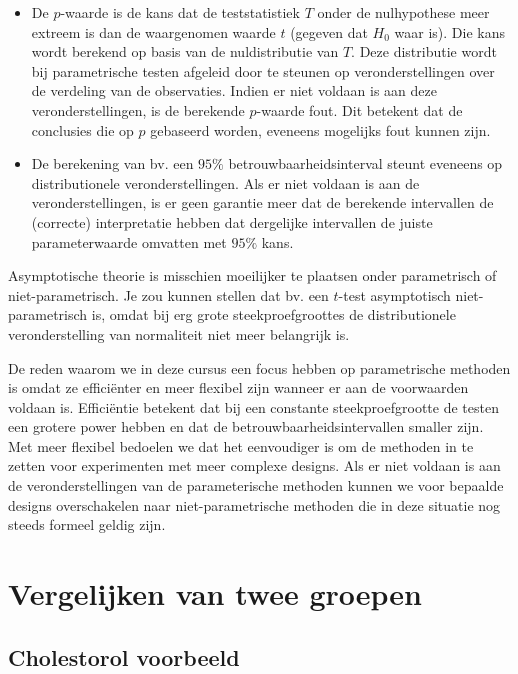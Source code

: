 \documentclass[
  12pt,dutch]{book}
\theoremstyle{definition}
\theoremstyle{definition}
\theoremstyle{definition}
\theoremstyle{definition}
\theoremstyle{remark}
\begin{document}
\begin{itemize}
\item
  De \(p\)-waarde is de kans dat de teststatistiek \(T\) onder de nulhypothese meer extreem is dan de waargenomen waarde \(t\) (gegeven dat \(H_0\) waar is). Die kans wordt berekend op basis van de nuldistributie van \(T\). Deze distributie wordt bij parametrische testen afgeleid door te steunen op veronderstellingen over de verdeling van de observaties. Indien er niet voldaan is aan deze veronderstellingen, is de berekende \(p\)-waarde fout. Dit betekent dat de conclusies die op \(p\) gebaseerd worden, eveneens mogelijks fout kunnen zijn.
\item
  De berekening van bv. een \(95\%\) betrouwbaarheidsinterval steunt eveneens op distributionele veronderstellingen. Als er niet voldaan is aan de veronderstellingen, is er geen garantie meer dat de berekende intervallen de (correcte) interpretatie hebben dat dergelijke intervallen de juiste parameterwaarde omvatten met \(95\%\) kans.
\end{itemize}

Asymptotische theorie is misschien moeilijker te plaatsen onder parametrisch of niet-parametrisch. Je zou kunnen stellen dat bv. een \(t\)-test asymptotisch niet-parametrisch is, omdat bij erg grote steekproefgroottes de distributionele veronderstelling van normaliteit niet meer belangrijk is.

De reden waarom we in deze cursus een focus hebben op parametrische methoden is omdat ze efficiënter en meer flexibel zijn wanneer er aan de voorwaarden voldaan is. Efficiëntie betekent dat bij een constante steekproefgrootte de testen een grotere power hebben en dat de betrouwbaarheidsintervallen smaller zijn. Met meer flexibel bedoelen we dat het eenvoudiger is om de methoden in te zetten voor experimenten met meer complexe designs.
Als er niet voldaan is aan de veronderstellingen van de parameterische methoden kunnen we voor bepaalde designs overschakelen naar niet-parametrische methoden die in deze situatie nog steeds formeel geldig zijn.

\section{Vergelijken van twee groepen}\label{vergelijken-van-twee-groepen}

\subsection{Cholestorol voorbeeld}\label{cholestorol-voorbeeld}
\end{document}
